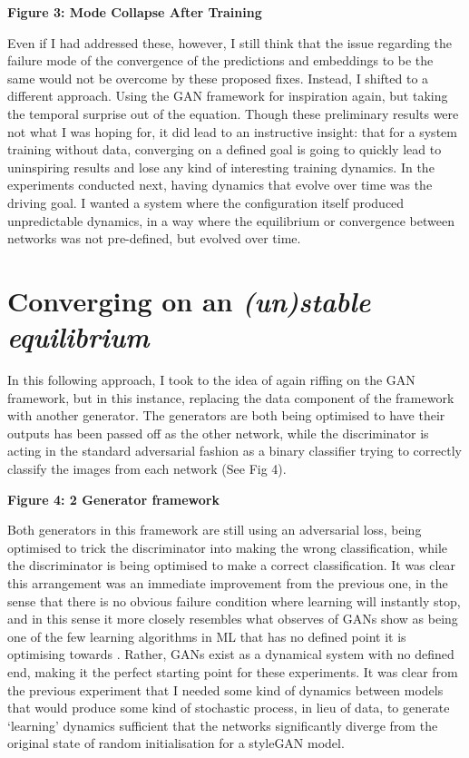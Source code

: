 \textbf{Figure 3: Mode Collapse After Training}

Even if I had addressed these, however, I still think that the issue regarding the failure mode of the convergence of the predictions and embeddings to be the same would not be overcome by these proposed fixes.
Instead, I shifted to a different approach. 
Using the GAN framework for inspiration again, but taking the temporal surprise out of the equation. 
Though these preliminary results were not what I was hoping for, it did lead to an instructive insight: that for a system training without data, converging on a defined goal is going to quickly lead to uninspiring results and lose any kind of interesting training dynamics. 
In the experiments conducted next, having dynamics that evolve over time was the driving goal. 
I wanted a system where the configuration itself produced unpredictable dynamics, in a way where the equilibrium or convergence between networks was not pre-defined, but evolved over time. 

\section{Converging on an \textit{(un)stable equilibrium}}

In this following approach, I took to the idea of again riffing on the GAN framework, but in this instance, replacing the data component of the framework with another generator. 
The generators are both being optimised to have their outputs has been passed off as the other network, while the discriminator is acting in the standard adversarial fashion as a binary classifier trying to correctly classify the images from each network (See Fig 4). 

\textbf{Figure 4: 2 Generator framework}

Both generators in this framework are still using an adversarial loss, being optimised to trick the discriminator into making the wrong classification, while the discriminator is being optimised to make a correct classification. 
It was clear this arrangement was an immediate improvement from the previous one, in the sense that there is no obvious failure condition where learning will instantly stop, and in this sense it more closely resembles what observes of GANs show as being one of the few learning algorithms in ML that has no defined point it is optimising towards \citep{nagarajan2017gradient}. 
Rather, GANs exist as a dynamical system with no defined end, making it the perfect starting point for these experiments. 
It was clear from the previous experiment that I needed some kind of dynamics between models that would produce some kind of stochastic process, in lieu of data, to generate ‘learning’ dynamics sufficient that the networks significantly diverge from the original state of random initialisation for a styleGAN model. 


